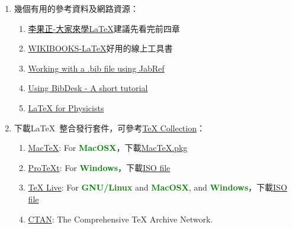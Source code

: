 \begin{acknowledgementsCH}
\begin{enumerate}[leftmargin=0pt, topsep=0pt, itemsep=0pt, label=\Roman{*}.]
\begin{enumerate}[topsep=0pt, itemsep=0pt, label=$\bullet$]
\end{enumerate}
\item 幾個有用的參考資料及網路資源：
\begin{enumerate}[topsep=0pt, itemsep=0pt, label=$\bullet$]
    \item \href{run:./latex123.pdf}{李果正-大家來學\LaTeX}\textemdash 建議先看完前四章
    \item \href{http://en.wikibooks.org/wiki/LaTeX}{WIKIBOOKS-\LaTeX}\textemdash 好用的線上工具書
    \item \href{run:./Working_with_a_bib_file_using_Jabref.pdf}{Working with a .bib file using JabRef}
    \item \href{run:./Fi087_S.pdf}{Using BibDesk - A short tutorial}
    \item \href{http://www.dfcd.net/articles/latex/latex.html}{LaTeX for Physicists}\\
\end{enumerate}
\item 下載\LaTeX\ 整合發行套件，可參考\href{http://www.tug.org/texcollection/}{TeX Collection}：\label{it:download}
 \begin{enumerate}[topsep=0pt, itemsep=0pt, label=\arabic{*}.]
     \item \href{http://www.tug.org/mactex/}{MacTeX}: For \textcolor{Green}{\textbf{MacOSX}}，下載\href{http://mirror.ctan.org/systems/mac/mactex/MacTeX.pkg}{MacTeX.pkg}
     \item \href{http://www.tug.org/protext/}{ProTeXt}: For \textcolor{Green}{\textbf{Windows}}，下載\href{ftp://ftp.fernuni-hagen.de/pub/windows/win32/ProTeXt/}{ISO file}
     \item \href{http://www.tug.org/texlive/}{TeX Live}: For \textcolor{Green}{\textbf{GNU/Linux}} and \textcolor{Green}{\textbf{MacOSX}}, and \textcolor{Green}{\textbf{Windows}}，下載\href{http://www.tug.org/texlive/acquire-iso.html}{ISO file}
     \item \href{http://ctan.org/}{CTAN}: The Comprehensive TeX Archive Network.\\
 \end{enumerate}


\end{enumerate}
\end{acknowledgementsCH}
